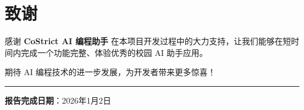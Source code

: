 ﻿\documentclass[12pt,a4paper]{article}
\begin{document}
\section{致谢}

感谢 \textbf{CoStrict AI 编程助手} 在本项目开发过程中的大力支持，让我们能够在短时间内完成一个功能完整、体验优秀的校园 AI 助手应用。

期待 AI 编程技术的进一步发展，为开发者带来更多惊喜！

\vspace{2cm}
\hrule
\vspace{0.5cm}

\begin{center}
\textbf{报告完成日期}：2026年1月2日
\end{center}
\end{document}
